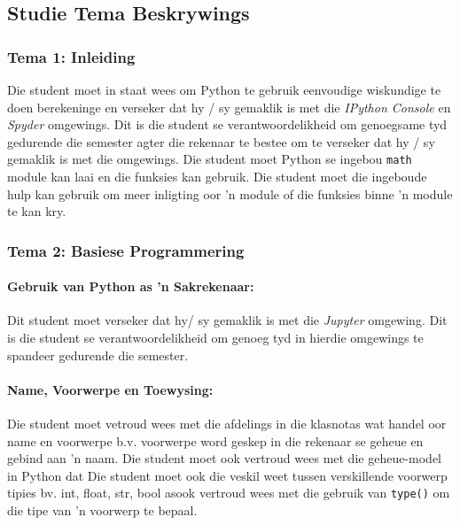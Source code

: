    \subsection{Studie Tema Beskrywings}
        \subsubsection{Tema 1: Inleiding}
            Die student moet in staat wees om Python te gebruik eenvoudige
            wiskundige te doen berekeninge en verseker dat hy / sy gemaklik is
            met die \emph{IPython Console} en \emph {Spyder} omgewings. Dit is
            die student se verantwoordelikheid om genoegsame tyd gedurende die
            semester agter die rekenaar te bestee om te verseker dat hy / sy
            gemaklik is met die omgewings. Die student moet Python se ingebou
            \texttt{math} module kan laai en die funksies kan gebruik. Die
            student moet die ingeboude hulp kan gebruik om meer inligting oor
            'n module of die funksies binne 'n module te kan kry.

        \subsubsection{Tema 2: Basiese Programmering}
            \paragraph{Gebruik van Python as 'n Sakrekenaar:}
                Dit student moet verseker dat hy/ sy gemaklik is met die
                \emph{Jupyter} omgewing. Dit is die student se
                verantwoordelikheid om genoeg tyd in hierdie omgewings te
                spandeer gedurende die semester.

            \paragraph{Name, Voorwerpe en Toewysing:}
                Die student moet vetroud wees met die afdelings in die
                klasnotas wat handel oor name en voorwerpe b.v. voorwerpe word
                geskep in die rekenaar se geheue en gebind aan 'n naam.  Die
                student moet ook vertroud wees met die geheue-model in Python
                dat Die student moet ook die veskil weet tussen verskillende
                voorwerp tipies bv. int, float, str, bool asook vertroud wees
                met die gebruik van \texttt{type()} om die tipe van 'n voorwerp
                te bepaal.

